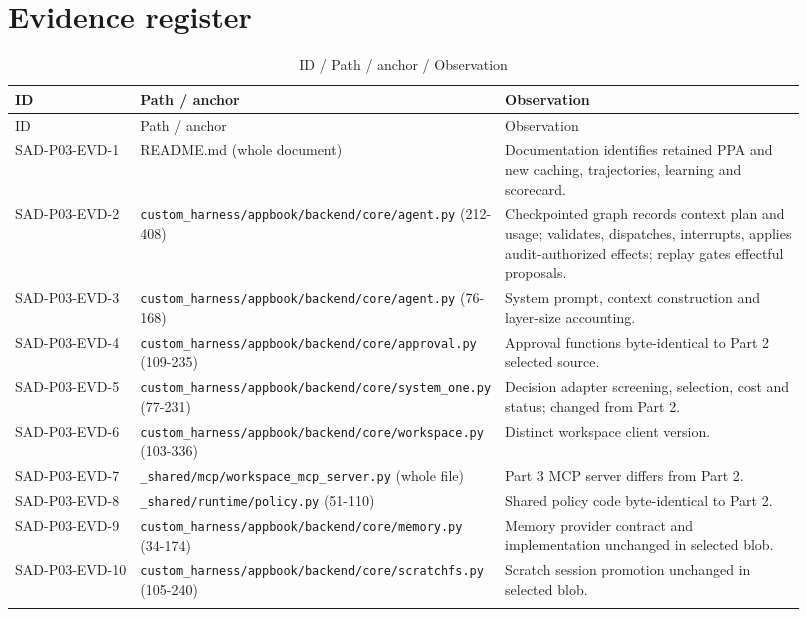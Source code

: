 \documentclass[10pt,letterpaper]{article}
\begin{document}
\section{Evidence register}
\begin{longtable}{@{}>{\raggedright\arraybackslash}p{0.17\linewidth}>{\raggedright\arraybackslash}p{0.34\linewidth}>{\raggedright\arraybackslash}p{0.41\linewidth}@{}}
\caption{ID / Path / anchor / Observation}\\
\toprule ID & Path / anchor & Observation\\\midrule\endfirsthead
\toprule ID & Path / anchor & Observation\\\midrule\endhead
SAD-P03-EVD-1 & README.md (whole document) & Documentation identifies retained PPA and new caching, trajectories, learning and scorecard.\\\addlinespace
SAD-P03-EVD-2 & \nolinkurl{custom_harness/appbook/backend/core/agent.py} (212-408) & Checkpointed graph records context plan and usage; validates, dispatches, interrupts, applies audit-authorized effects; replay gates effectful proposals.\\\addlinespace
SAD-P03-EVD-3 & \nolinkurl{custom_harness/appbook/backend/core/agent.py} (76-168) & System prompt, context construction and layer-size accounting.\\\addlinespace
SAD-P03-EVD-4 & \nolinkurl{custom_harness/appbook/backend/core/approval.py} (109-235) & Approval functions byte-identical to Part 2 selected source.\\\addlinespace
SAD-P03-EVD-5 & \nolinkurl{custom_harness/appbook/backend/core/system_one.py} (77-231) & Decision adapter screening, selection, cost and status; changed from Part 2.\\\addlinespace
SAD-P03-EVD-6 & \nolinkurl{custom_harness/appbook/backend/core/workspace.py} (103-336) & Distinct workspace client version.\\\addlinespace
SAD-P03-EVD-7 & \nolinkurl{_shared/mcp/workspace_mcp_server.py} (whole file) & Part 3 MCP server differs from Part 2.\\\addlinespace
SAD-P03-EVD-8 & \nolinkurl{_shared/runtime/policy.py} (51-110) & Shared policy code byte-identical to Part 2.\\\addlinespace
SAD-P03-EVD-9 & \nolinkurl{custom_harness/appbook/backend/core/memory.py} (34-174) & Memory provider contract and implementation unchanged in selected blob.\\\addlinespace
SAD-P03-EVD-10 & \nolinkurl{custom_harness/appbook/backend/core/scratchfs.py} (105-240) & Scratch session promotion unchanged in selected blob.\\\addlinespace

\end{longtable}
\end{document}
